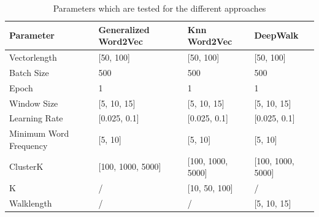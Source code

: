 \begin{table}[!htb]
\centering

\begin{tabular}{llll}
\hline
Parameter                                    & Generalized Word2Vec  & Knn Word2Vec          & DeepWalk              \\ \hline
\multicolumn{1}{l|}{Vectorlength}            & {[}50, 100{]}         & {[}50, 100{]}         & {[}50, 100{]}         \\
\multicolumn{1}{l|}{Batch Size}              & 500                   & 500                   & 500                   \\
\multicolumn{1}{l|}{Epoch}                   & 1                     & 1                     & 1                     \\
\multicolumn{1}{l|}{Window Size}             & {[}5, 10, 15{]}       & {[}5, 10, 15{]}       & {[}5, 10, 15{]}       \\
\multicolumn{1}{l|}{Learning Rate}           & {[}0.025, 0.1{]}      & {[}0.025, 0.1{]}      & {[}0.025, 0.1{]}      \\
\multicolumn{1}{l|}{Minimum Word Frequency} & {[}5, 10{]}           & {[}5, 10{]}           & {[}5, 10{]}           \\
\multicolumn{1}{l|}{ClusterK}                & {[}100, 1000, 5000{]} & {[}100, 1000, 5000{]} & {[}100, 1000, 5000{]} \\
\multicolumn{1}{l|}{K}                       & /                     & {[}10, 50, 100{]}     & /                     \\
\multicolumn{1}{l|}{Walklength}              & /                     & /                     & {[}5, 10, 15{]}      
\end{tabular}

\caption{Parameters which are tested for the different approaches}
\label{tab:parameters}
\end{table}


